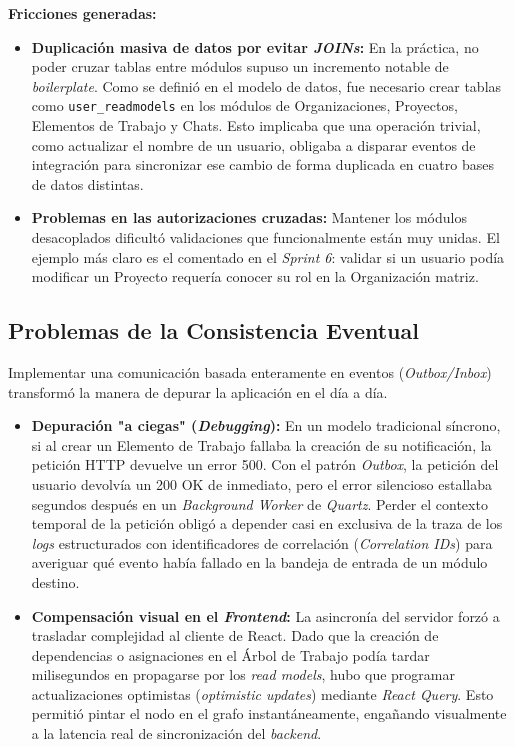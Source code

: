 \textbf{Fricciones generadas:}
\begin{itemize}
    \item \textbf{Duplicación masiva de datos por evitar \emph{JOINs}:} En la práctica, no poder cruzar tablas entre módulos supuso un incremento notable de \emph{boilerplate}. Como se definió en el modelo de datos, fue necesario crear tablas como \texttt{user\_readmodels} en los módulos de Organizaciones, Proyectos, Elementos de Trabajo y Chats. Esto implicaba que una operación trivial, como actualizar el nombre de un usuario, obligaba a disparar eventos de integración para sincronizar ese cambio de forma duplicada en cuatro bases de datos distintas.
    \item \textbf{Problemas en las autorizaciones cruzadas:} Mantener los módulos desacoplados dificultó validaciones que funcionalmente están muy unidas. El ejemplo más claro es el comentado en el \emph{Sprint 6}: validar si un usuario podía modificar un Proyecto requería conocer su rol en la Organización matriz.
\end{itemize}

\subsection{Problemas de la Consistencia Eventual}
Implementar una comunicación basada enteramente en eventos (\emph{Outbox/Inbox}) transformó la manera de depurar la aplicación en el día a día.

\begin{itemize}
    \item \textbf{Depuración "a ciegas" (\emph{Debugging}):} En un modelo tradicional síncrono, si al crear un Elemento de Trabajo fallaba la creación de su notificación, la petición HTTP devuelve un error 500. Con el patrón \emph{Outbox}, la petición del usuario devolvía un 200 OK de inmediato, pero el error silencioso estallaba segundos después en un \emph{Background Worker} de \emph{Quartz}. Perder el contexto temporal de la petición obligó a depender casi en exclusiva de la traza de los \emph{logs} estructurados con identificadores de correlación (\emph{Correlation IDs}) para averiguar qué evento había fallado en la bandeja de entrada de un módulo destino.
    \item \textbf{Compensación visual en el \emph{Frontend}:} La asincronía del servidor forzó a trasladar complejidad al cliente de React. Dado que la creación de dependencias o asignaciones en el Árbol de Trabajo podía tardar milisegundos en propagarse por los \emph{read models}, hubo que programar actualizaciones optimistas (\emph{optimistic updates}) mediante \emph{React Query}. Esto permitió pintar el nodo en el grafo instantáneamente, engañando visualmente a la latencia real de sincronización del \emph{backend}.
\end{itemize}

